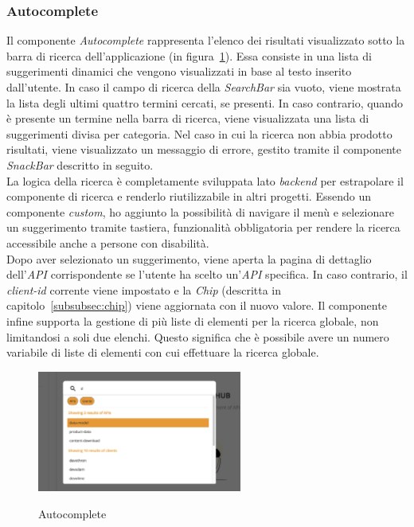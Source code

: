 \subsubsection{Autocomplete}\label{subsubsec:autocomplete}
Il componente \textit{Autocomplete} rappresenta l'elenco dei risultati visualizzato sotto la barra di ricerca dell'applicazione (in figura~\ref{fig:autocomplete}).
Essa consiste in una lista di suggerimenti dinamici che vengono visualizzati in base al testo inserito dall'utente. 
In caso il campo di ricerca della \textit{SearchBar} sia vuoto, viene mostrata la lista degli ultimi quattro termini cercati, se presenti.
In caso contrario, quando è presente un termine nella barra di ricerca, viene visualizzata una lista di suggerimenti divisa per categoria.
Nel caso in cui la ricerca non abbia prodotto risultati, viene visualizzato un messaggio di errore, gestito tramite il componente \textit{SnackBar} descritto in seguito.\\
La logica della ricerca è completamente sviluppata lato \textit{backend} per estrapolare il componente di ricerca e renderlo riutilizzabile in altri progetti.
Essendo un componente \textit{custom}, ho aggiunto la possibilità di navigare il menù e selezionare un suggerimento tramite tastiera, funzionalità 
obbligatoria per rendere la ricerca accessibile anche a persone con disabilità.\\
Dopo aver selezionato un suggerimento, viene aperta la pagina di dettaglio dell'\textit{API} corrispondente se l'utente ha scelto un'\textit{API} specifica.  In caso contrario, il \textit{client-id} corrente viene impostato e la \textit{Chip} (descritta in capitolo~\ref{subsubsec:chip}) viene aggiornata con il nuovo valore.
Il componente infine supporta la gestione di più liste di elementi per la ricerca globale, non limitandosi a soli due elenchi. Questo significa che è possibile avere un numero variabile di liste di elementi con cui effettuare la ricerca globale. 

\begin{figure}[ht]
  \centering
  \includegraphics[width=0.6\textwidth, alt={Componente che si occupa della lista dinamica di risultati}]{images/frontend/SearchBar2.jpg}
  \caption{Autocomplete}\label{fig:autocomplete}
\end{figure}
\pagebreak
